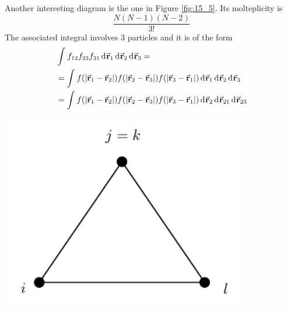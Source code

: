 \documentclass[../main/main.tex]{subfiles}
\begin{document}
\begin{minipage}[c]{0.7\linewidth}
Another interesting diagram is the one in Figure \ref{fig:15_5}. Its molteplicity is
\begin{equation*}
  \frac{N(N-1)(N-2)}{3!}
\end{equation*}
The associated integral involves 3 particles and it is of the form
\begin{equation*}
\begin{split}
   & \int_{}^{} f_{12} f_{23} f_{31} \dd[]{\va{r}_1}  \dd[]{\va{r}_2} \dd[]{\va{r}_3} = \\
   & = \int_{}^{} f ( \abs{\va{r}_1 - \va{r}_2} ) f ( \abs{\va{r}_2 - \va{r}_3} )  f ( \abs{\va{r}_3 - \va{r}_1} )  \dd[]{\va{r}_1} \dd[]{\va{r}_2} \dd[]{\va{r}_3} \\
   & = \int_{}^{} f ( \abs{\va{r}_1 - \va{r}_2} ) f ( \abs{\va{r}_2 - \va{r}_3} )  f ( \abs{\va{r}_3 - \va{r}_1} )  \dd[]{\va{r}_2} \dd[]{\va{r}_{21}} \dd[]{\va{r}_{23}}
\end{split}
\end{equation*}
\end{minipage}
\begin{minipage}[]{0.3\linewidth}
\centering
\includegraphics[width=0.8\textwidth]{../lessons/15_image/8.pdf}
\end{minipage}
\end{document}
